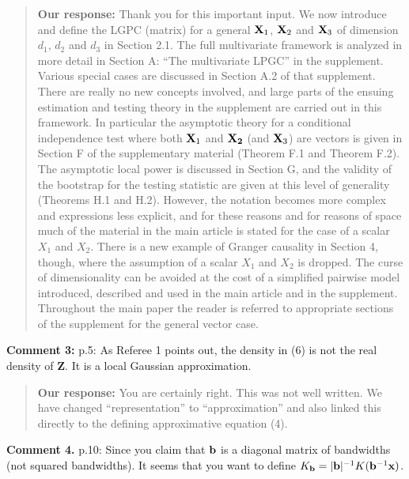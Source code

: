 \documentclass[
  12pt,
  letterpaper]{article}
\numberwithin{equation}{section}
\newcommand{\Z}{\bm{Z}}
\begin{document}
\begin{quote}
\textbf{Our response:} Thank you for this important input. We now introduce and define the LGPC (matrix) for a general \({\bf X}_1\), \({\bf X}_2\) and \({\bf X}_3\) of dimension \(d_1\), \(d_2\) and \(d_3\) in Section 2.1. The full multivariate framework is analyzed in more detail in Section A: ``The multivariate LPGC'' in the supplement. Various special cases are discussed in Section A.2 of that supplement. There are really no new concepts involved, and large parts of the ensuing estimation and testing theory in the supplement are carried out in this framework.
\vspace{.3cm} \newline 
In particular the asymptotic theory for a conditional independence test where both \({\bf X}_1\) and \({\bf X_2}\) (and \({\bf X}_3\)) are vectors is given in Section F of the supplementary material (Theorem F.1 and Theorem F.2). The asymptotic local power is discussed in Section G, and the validity of the bootstrap for the testing statistic are given at this level of generality (Theorems H.1 and H.2). However, the notation becomes more complex and expressions less explicit, and for these reasons and for reasons of space much of the material in the main article is stated for the case of a scalar \(X_1\) and \(X_2\). There is a new example of Granger causality in Section 4, though, where the assumption of a scalar \(X_1\) and \(X_2\) is dropped. The curse of dimensionality can be avoided at the cost of a simplified pairwise model introduced, described and used in the main article and in the supplement. Throughout the main paper the reader is referred to appropriate sections of the supplement for the general vector case.
\end{quote}

\textbf{Comment 3:} p.5: As Referee 1 points out, the density in (6) is not the real density of \({\Z}\). It is a local Gaussian approximation.

\begin{quote}
\textbf{Our response:} You are certainly right. This was not well written. We have changed ``representation'' to ``approximation'' and also linked this directly to the defining approximative equation (4).
\end{quote}

\textbf{Comment 4.} p.10: Since you claim that \({\bf b}\) is a diagonal matrix of bandwidths (not squared bandwidths). It seems that you want to define \(K_{\bf b} = |{\bf b}|^{-1}K({\bf b}^{-1}{\bf x})\).
\end{document}
